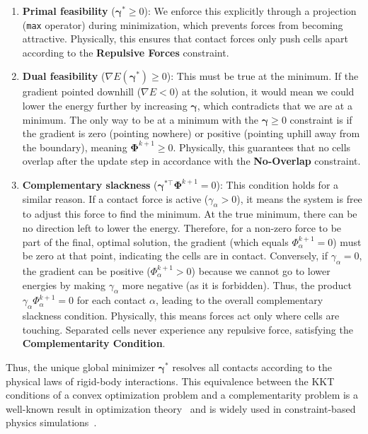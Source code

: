 \documentclass[conference]{IEEEtran}
\begin{document}
\begin{enumerate}
    \item \textbf{Primal feasibility} ($\boldsymbol{\gamma}^* \geq 0$): We enforce this explicitly through a projection (\texttt{max} operator) during minimization, which prevents forces from becoming attractive. Physically, this ensures that contact forces only push cells apart according to the \textbf{Repulsive Forces} constraint.

    \item \textbf{Dual feasibility} ($\nabla E(\boldsymbol{\gamma}^*) \geq 0$): This must be true at the minimum. If the gradient pointed downhill ($\nabla E < 0$) at the solution, it would mean we could lower the energy further by increasing $\boldsymbol{\gamma}$, which contradicts that we are at a minimum. The only way to be at a minimum with the $\boldsymbol{\gamma} \geq 0$ constraint is if the gradient is zero (pointing nowhere) or positive (pointing uphill away from the boundary), meaning $\boldsymbol{\Phi}^{k+1} \geq 0$. Physically, this guarantees that no cells overlap after the update step in accordance with the \textbf{No-Overlap} constraint.

    \item \textbf{Complementary slackness} ($\boldsymbol{\gamma}^{*\top} \boldsymbol{\Phi}^{k+1} = 0$): This condition holds for a similar reason. If a contact force is active ($\gamma_\alpha > 0$), it means the system is free to adjust this force to find the minimum. At the true minimum, there can be no direction left to lower the energy. Therefore, for a non-zero force to be part of the final, optimal solution, the gradient (which equals $\Phi^{k+1}_\alpha = 0$) must be zero at that point, indicating the cells are in contact. Conversely, if $\gamma_\alpha = 0$, the gradient can be positive ($\Phi^{k+1}_\alpha > 0$) because we cannot go to lower energies by making $\gamma_\alpha$ more negative (as it is forbidden). Thus, the product $\gamma_\alpha \Phi^{k+1}_\alpha = 0$ for each contact $\alpha$, leading to the overall complementary slackness condition. Physically, this means forces act only where cells are touching. Separated cells never experience any repulsive force, satisfying the \textbf{Complementarity Condition}.
\end{enumerate}

Thus, the unique global minimizer $\boldsymbol{\gamma}^*$ resolves all contacts according to the physical laws of rigid-body interactions. This equivalence between the KKT conditions of a convex optimization problem and a complementarity problem is a well-known result in optimization theory~\cite{Nocedal2006} and is widely used in constraint-based physics simulations~\cite{Yan2022,Tasora2008, Yan2019, Li2021, Weady2024SM,Rudge2012,Macklin2014,Ferguson2021}.
\end{document}
